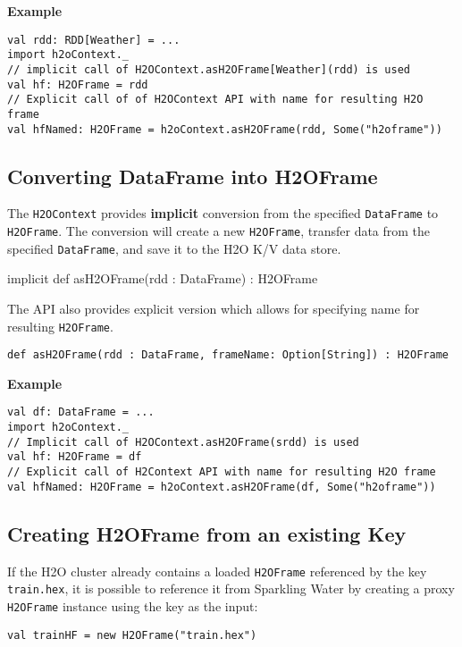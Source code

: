 \textbf{Example}

\begin{lstlisting}[style=Scala]
val rdd: RDD[Weather] = ...
import h2oContext._
// implicit call of H2OContext.asH2OFrame[Weather](rdd) is used 
val hf: H2OFrame = rdd
// Explicit call of of H2OContext API with name for resulting H2O frame
val hfNamed: H2OFrame = h2oContext.asH2OFrame(rdd, Some("h2oframe"))
\end{lstlisting}

\subsection{Converting DataFrame into H2OFrame}

The \texttt{H2OContext} provides \textbf{implicit} conversion from the specified \texttt{DataFrame} to \texttt{H2OFrame}. The conversion will create a new \texttt{H2OFrame}, transfer data from the specified \texttt{DataFrame}, and save it to the H2O K/V data store.

implicit def asH2OFrame(rdd : DataFrame) : H2OFrame

The API also provides explicit version which allows for specifying name for resulting \texttt{H2OFrame}.

\begin{lstlisting}[style=Scala]
def asH2OFrame(rdd : DataFrame, frameName: Option[String]) : H2OFrame
\end{lstlisting}

\textbf{Example}

\begin{lstlisting}[style=Scala]
val df: DataFrame = ...
import h2oContext._
// Implicit call of H2OContext.asH2OFrame(srdd) is used 
val hf: H2OFrame = df 
// Explicit call of H2Context API with name for resulting H2O frame
val hfNamed: H2OFrame = h2oContext.asH2OFrame(df, Some("h2oframe"))
\end{lstlisting}

\subsection{Creating H2OFrame from an existing Key}

If the H2O cluster already contains a loaded \texttt{H2OFrame} referenced by the key \texttt{train.hex}, it is possible to reference it from Sparkling Water by creating a proxy \texttt{H2OFrame} instance using the key as the input:

\begin{lstlisting}[style=Scala]
val trainHF = new H2OFrame("train.hex")
\end{lstlisting}

